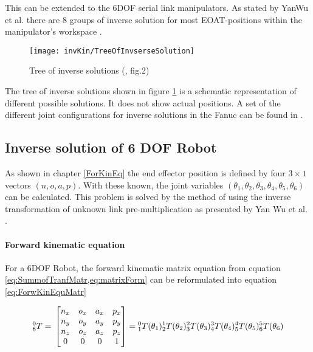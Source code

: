 This can be extended to the 6\ac{DOF} serial link manipulators.
As stated by YanWu et al. there are 8 groups of inverse solution for most \ac{EOAT}-positions within the manipulator's workspace \cite{invKinSolYanWu}. 

\begin{figure}[H]
	\texttt{[image: invKin/TreeOfInvserseSolution]}
	\caption{Tree of inverse solutions (\cite{invKinSolYanWu}, fig.2)}
	\label{fig:invKinTree}
\end{figure}
%
The tree of inverse solutions shown in figure \ref{fig:invKinTree} is a schematic representation of different possible solutions. It does not show actual positions. A set of the different joint configurations for inverse solutions in the Fanuc can be found in .


\subsection{Inverse solution of 6 \ac{DOF} Robot}

As shown in chapter \ref{ForKinEq} the end effector position is defined by four $3 \times 1$ vectors $ (n,o,a,p) $. With these known, the joint variables $(\theta_1, \theta_2, \theta_3, \theta_4, \theta_5, \theta_6)$ can be calculated.
This problem  is solved by the method of using the inverse transformation of unknown link pre-multiplication as presented by Yan Wu et al. \cite{invKinSolYanWu}. 

\paragraph{Forward kinematic equation}
For a  6\ac{DOF} Robot, the  forward kinematic matrix equation from equation \cref{eq:SummofTranfMatr,eq:matrixForm} can be reformulated into equation \ref{eq:ForwKinEquMatr}

\begin{equation}\label{eq:ForwKinEquMatr}
	^0_6T = \\
	\begin{bmatrix}
n_x & o_x & a_x & p_x \\
n_y & o_y & a_y & p_y \\
n_z & o_z & a_z & p_z \\
0 & 0 & 0 & 1 \\
\end{bmatrix}
=
\phantom{}^0_1T(\theta_1)\phantom{}^1_2T(\theta_2)\phantom{}^2_3T(\theta_3)\phantom{}^3_4T(\theta_4)\phantom{}^4_5T(\theta_5)\phantom{}^5_6T(\theta_6)\\
\end{equation}

